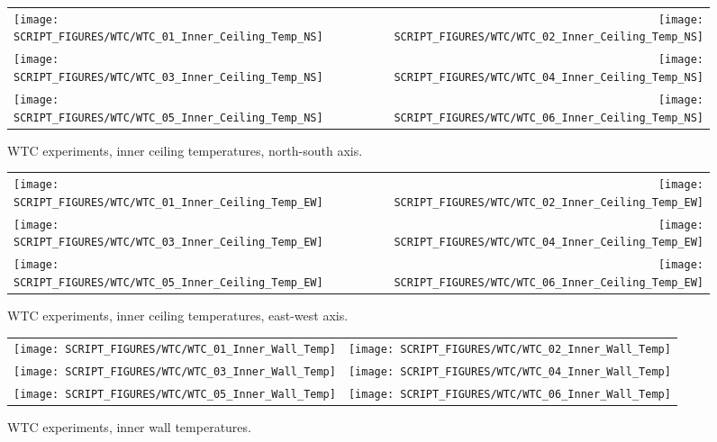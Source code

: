 \begin{figure}[p]
\begin{tabular*}{\textwidth}{l@{\extracolsep{\fill}}r}
\texttt{[image: SCRIPT\_FIGURES/WTC/WTC\_01\_Inner\_Ceiling\_Temp\_NS]} &
\texttt{[image: SCRIPT\_FIGURES/WTC/WTC\_02\_Inner\_Ceiling\_Temp\_NS]} \\
\texttt{[image: SCRIPT\_FIGURES/WTC/WTC\_03\_Inner\_Ceiling\_Temp\_NS]} &
\texttt{[image: SCRIPT\_FIGURES/WTC/WTC\_04\_Inner\_Ceiling\_Temp\_NS]} \\
\texttt{[image: SCRIPT\_FIGURES/WTC/WTC\_05\_Inner\_Ceiling\_Temp\_NS]} &
\texttt{[image: SCRIPT\_FIGURES/WTC/WTC\_06\_Inner\_Ceiling\_Temp\_NS]}
\end{tabular*}
\caption[WTC experiments, inner ceiling temperatures, north-south axis]{WTC experiments, inner ceiling temperatures, north-south axis.}
\label{NIST_WTC_Inner_Ceiling_NS}
\end{figure}

\begin{figure}[p]
\begin{tabular*}{\textwidth}{l@{\extracolsep{\fill}}r}
\texttt{[image: SCRIPT\_FIGURES/WTC/WTC\_01\_Inner\_Ceiling\_Temp\_EW]} &
\texttt{[image: SCRIPT\_FIGURES/WTC/WTC\_02\_Inner\_Ceiling\_Temp\_EW]} \\
\texttt{[image: SCRIPT\_FIGURES/WTC/WTC\_03\_Inner\_Ceiling\_Temp\_EW]} &
\texttt{[image: SCRIPT\_FIGURES/WTC/WTC\_04\_Inner\_Ceiling\_Temp\_EW]} \\
\texttt{[image: SCRIPT\_FIGURES/WTC/WTC\_05\_Inner\_Ceiling\_Temp\_EW]} &
\texttt{[image: SCRIPT\_FIGURES/WTC/WTC\_06\_Inner\_Ceiling\_Temp\_EW]}
\end{tabular*}
\caption[WTC experiments, inner ceiling temperatures, east-west axis]{WTC experiments, inner ceiling temperatures, east-west axis.}
\label{NIST_WTC_Inner_Ceiling_EW}
\end{figure}

\begin{figure}[p]
\begin{tabular*}{\textwidth}{l@{\extracolsep{\fill}}r}
\texttt{[image: SCRIPT\_FIGURES/WTC/WTC\_01\_Inner\_Wall\_Temp]} &
\texttt{[image: SCRIPT\_FIGURES/WTC/WTC\_02\_Inner\_Wall\_Temp]} \\
\texttt{[image: SCRIPT\_FIGURES/WTC/WTC\_03\_Inner\_Wall\_Temp]} &
\texttt{[image: SCRIPT\_FIGURES/WTC/WTC\_04\_Inner\_Wall\_Temp]} \\
\texttt{[image: SCRIPT\_FIGURES/WTC/WTC\_05\_Inner\_Wall\_Temp]} &
\texttt{[image: SCRIPT\_FIGURES/WTC/WTC\_06\_Inner\_Wall\_Temp]}
\end{tabular*}
\caption[WTC experiments, inner wall temperatures]{WTC experiments, inner wall temperatures.}
\label{NIST_WTC_Inner_Wall}
\end{figure}

